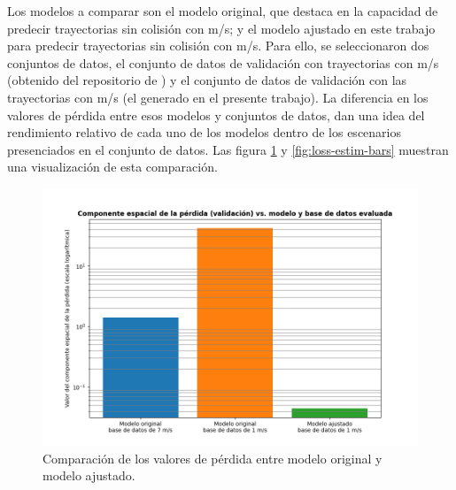 Los modelos a comparar son el modelo original, que destaca en la capacidad de predecir trayectorias sin colisión con  m/s; y el modelo ajustado en este trabajo para predecir trayectorias sin colisión con  m/s. Para ello, se seleccionaron dos conjuntos de datos, el conjunto de datos de validación con trayectorias con  m/s (obtenido del repositorio de \cite{Loquercio2021}) y el conjunto de datos de validación con las trayectorias con  m/s (el generado en el presente trabajo). La diferencia en los valores de pérdida entre esos modelos y conjuntos de datos, dan una idea del rendimiento relativo de cada uno de los modelos dentro de los escenarios presenciados en el conjunto de datos. Las figura \ref{fig:loss-space-bars} y \ref{fig:loss-estim-bars} muestran una visualización de esta comparación.

\begin{figure}[H]
    \centering
    \includegraphics[scale=0.6]{partes/img/loss-space-bars.png}
    \caption[Comparación de los valores del componente de pérdida espacial entre modelo original y modelo ajustado.]{Comparación de los valores de pérdida entre modelo original y modelo ajustado.}
    \label{fig:loss-space-bars}
\end{figure}

